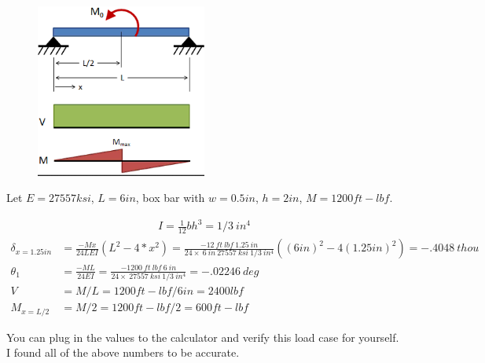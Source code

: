 \documentclass[10pt,letterpaper]{article}
\begin{document}
	\begin{figure}[H]
		\includegraphics[width=0.5\textwidth]{beam_case2_schematic.png}
	\end{figure}

	Let $E = 27557 ksi$, $L = 6 in$, box bar with $w = 0.5 in$, $h = 2in$, $M = 1200 ft-lbf$.

	\begin{align}
		I = \frac{1}{12} b h^3 = 1/3 \ in^4
	\end{align}
	\begin{align}
		\delta_{x = 1.25 in} &= \frac{ - M x}{24 L E I}(L^2 - 4*x^2) = \frac{-12\ ft\ lbf\ 1.25 \ in}{24 \times \ 6 \ in \ 27557 \ ksi \ 1/3 \ in^4} ((6 in)^2 - 4 (1.25 in)^2) = -.4048 \ thou \\
		\theta_{1} &= \frac{- M L}{24 E I} = \frac{-1200\ ft\ lbf\ 6 \ in}{24 \times \ 27557 \ ksi \ 1/3 \ in^4} = -.02246 \ deg \\
		V &= M / L = 1200 ft-lbf / 6 in = 2400 lbf \\
		M_{x=L/2} &= M / 2 = 1200 ft-lbf / 2 = 600 ft-lbf
	\end{align}

	You can plug in the values to the calculator and verify this load case for yourself. I found all of the above numbers to be accurate.
\end{document}
